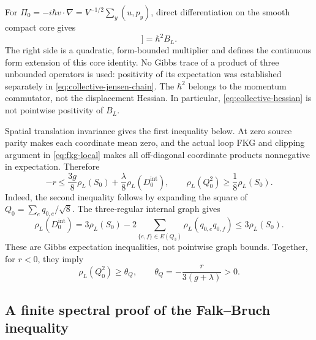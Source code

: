\documentclass[11pt]{article}
\numberwithin{equation}{section}
\theoremstyle{definition}
\begin{document}
For $\Pi_0=-i\hbar v\cdot\nabla=V^{-1/2}\sum_y(u,p_y)$, direct
differentiation on the smooth compact core gives
\begin{equation}
 [\Pi_0,[H_L(0),\Pi_0]]=\hbar^2B_L. \label{eq:double-commutator}
\end{equation}
The right side is a quadratic, form-bounded multiplier and defines the
continuous form extension of this core identity.  No Gibbs trace of a
product of three unbounded operators is used: positivity of its expectation
was established separately in \eqref{eq:collective-jensen-chain}.
The $\hbar^2$ belongs to the momentum commutator, not the displacement
Hessian.  In particular, \eqref{eq:collective-hessian} is not pointwise
positivity of $B_L$.

Spatial translation invariance gives the first inequality below.  At zero
source parity makes each coordinate mean zero, and the actual loop FKG
and clipping argument in \eqref{eq:fkg-local} makes all off-diagonal
coordinate products nonnegative in expectation.  Therefore
\begin{equation}
 -r\leq\frac{3g}{8}\rho_L(S_0)+\frac\lambda8\rho_L(D_0^{\mathrm{int}}),
 \qquad \rho_L(Q_0^2)\geq\frac18\rho_L(S_0). \label{eq:moment-chain}
\end{equation}
Indeed, the second inequality follows by expanding the square of
$Q_0=\sum_e q_{0,e}/\sqrt8$.  The three-regular internal graph gives
\begin{equation}
 \rho_L(D_0^{\mathrm{int}})
 =3\rho_L(S_0)-2\sum_{\{e,f\}\in E(Q_3)}\rho_L(q_{0,e}q_{0,f})
 \leq3\rho_L(S_0).
 \label{eq:collective-graph-expectation}
\end{equation}
These are Gibbs expectation inequalities, not pointwise graph bounds.
Together, for $r<0$, they imply
\begin{equation}
 \rho_L(Q_0^2)\geq\theta_Q,\qquad
 \theta_Q=-\frac r{3(g+\lambda)}>0. \label{eq:theta-q}
\end{equation}

\subsection{A finite spectral proof of the Falk--Bruch inequality}
\label{sec:finite-falk-bruch}
\end{document}
